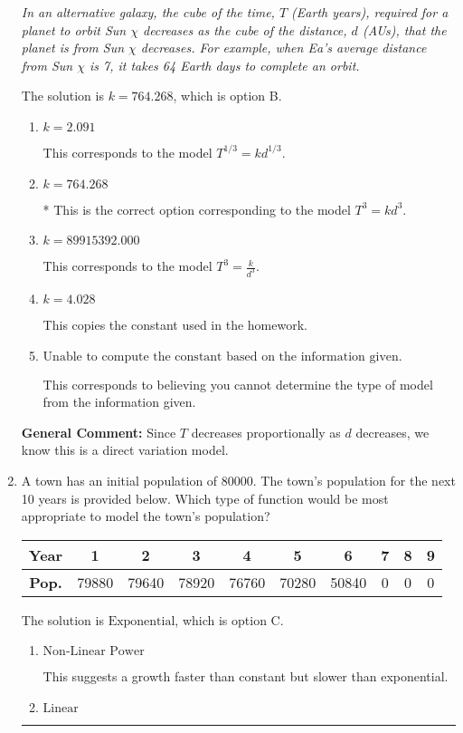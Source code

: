 \documentclass{extbook}[14pt]
\newcommand{\litem}[1]{\item #1

\rule{\textwidth}{0.4pt}}
\begin{document}
\begin{enumerate}
{\begin{center}
    \textit{ In an alternative galaxy, the cube of the time, $T$ (Earth years), required for a planet to orbit Sun $\chi$ decreases as the cube of the distance, $d$ (AUs), that the planet is from Sun $\chi$ decreases. For example, when Ea's average distance from Sun $\chi$ is 7, it takes 64 Earth days to complete an orbit. }
\end{center}


The solution is \( k = 764.268 \), which is option B.\begin{enumerate}[label=\Alph*.]
\item \( k = 2.091 \)

This corresponds to the model $T^{1/3} = k d^{1/3}$.
\item \( k = 764.268 \)

* This is the correct option corresponding to the model $T^{3} = k d^{3}$.
\item \( k = 89915392.000 \)

This corresponds to the model $T^{3} = \frac{k}{d^{3}}$.
\item \( k = 4.028 \)

This copies the constant used in the homework.
\item \( \text{Unable to compute the constant based on the information given.} \)

This corresponds to believing you cannot determine the type of model from the information given.
\end{enumerate}

\textbf{General Comment:} Since $T$ decreases proportionally as $d$ decreases, we know this is a direct variation model.
}
\litem{
A town has an initial population of 80000. The town's population for the next 10 years is provided below. Which type of function would be most appropriate to model the town's population?



\begin{tabular}{c|c|c|c|c|c|c|c|c|c}
\textbf{Year} & 1 & 2 & 3 & 4 & 5 & 6 & 7 & 8 & 9 \tabularnewline
\hline
\textbf{Pop.} & 79880 & 79640 & 78920 & 76760 & 70280 & 50840 & 0 & 0 & 0
\end{tabular} 

The solution is \( \text{Exponential} \), which is option C.\begin{enumerate}[label=\Alph*.]
\item \( \text{Non-Linear Power} \)

This suggests a growth faster than constant but slower than exponential.
\item \( \text{Linear} \)


\end{enumerate}}
\end{enumerate}
\end{document}
